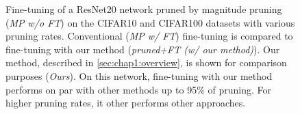 \begin{figure}
\centering
{}
  \caption{ Fine-tuning of a ResNet20 network pruned by magnitude pruning
  (\emph{MP w/o FT}) on the CIFAR10 and CIFAR100 datasets with various pruning
  rates. Conventional (\emph{MP w/ FT}) fine-tuning is compared to fine-tuning
  with our method (\emph{pruned+FT (w/ our method)}). Our method, described in
  \cref{sec:chap1:overview}, is shown for comparison purposes (\emph{Ours}). On
  this network, fine-tuning with our method performs on par with other methods
  up to 95\% of pruning. For higher pruning rates, it other performs other
  approaches.}
    \label{fig:chap1:finetuning_impact_vgg6}
\end{figure}


